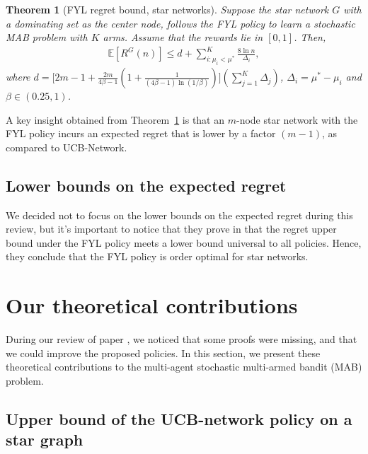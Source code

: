 \documentclass{article}
\newtheorem{theorem}{Theorem}
\begin{document}
\begin{theorem}[FYL regret bound, star networks]
\label{Thm:5.1}
Suppose the star network $G$ with a dominating set as the center node, follows the FYL policy to learn a stochastic MAB problem with $K$ arms. Assume that the rewards lie in $[0,1]$. Then,
\begin{align*}
\mathbb{E}[R^G(n)] \leq d + \sum\limits_{i:\mu_i < \mu^*}^K \frac{8 \ln n}{\Delta_i},
\end{align*}
where $d = \Big[ 2m - 1 + \frac{2 m}{4 \beta -1} \left( 1 + \frac{1}{(4 \beta -1) \ln (1/ \beta)} \right) \Big] \left( \sum\limits_{j=1}^K \Delta_j \right)$, $\Delta_i= \mu^* - \mu_i$ and $\beta \in (0.25,1)$.
\end{theorem}

A key insight obtained from Theorem~\ref{Thm:5.1} is that an $m$-node star network with the FYL policy incurs an expected regret that is lower by a factor $(m - 1)$, as compared to UCB-Network.

\subsection{Lower bounds on the expected regret}

We decided not to focus on the lower bounds on the expected regret during this review, but it's important to notice that they prove in \cite{DBLP:journals/corr/KollaJG16} that the regret upper bound under the FYL policy meets a lower bound universal to all policies. Hence, they conclude that the FYL policy is order optimal for star networks.


\section{Our theoretical contributions}

During our review of paper \cite{DBLP:journals/corr/KollaJG16}, we noticed that some proofs were missing, and that we could improve the proposed policies. In this section, we present these theoretical contributions to the multi-agent stochastic multi-armed bandit (MAB) problem.

\subsection{Upper bound of the UCB-network policy on a star graph}
\end{document}
